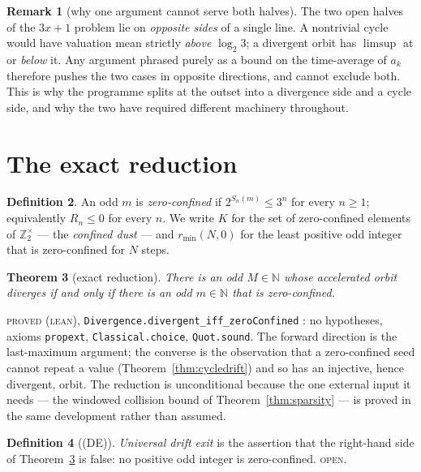 \documentclass[11pt,reqno]{amsart}
\theoremstyle{plain}
\newtheorem{theorem}{Theorem}[section]
\theoremstyle{definition}
\newtheorem{definition}[theorem]{Definition}
\newtheorem{remark}[theorem]{Remark}
\newcommand{\Zt}{\mathbb{Z}_2}
\newcommand{\N}{\mathbb{N}}
\newcommand{\lab}[1]{\textnormal{\textsc{\small #1}}}
\begin{document}
\begin{remark}[why one argument cannot serve both halves]\label{rem:twohalves}
The two open halves of the $3x+1$ problem lie on \emph{opposite sides} of a single
line. A nontrivial cycle would have valuation mean strictly \emph{above}
$\log_2 3$; a divergent orbit has $\limsup$ at or \emph{below} it. Any argument
phrased purely as a bound on the time-average of $a_k$ therefore pushes the two
cases in opposite directions, and cannot exclude both. This is why the programme
splits at the outset into a divergence side and a cycle side, and why the two have
required different machinery throughout.
\end{remark}

\section{The exact reduction}\label{sec:reduction}

\begin{definition}\label{def:confined}
An odd $m$ is \emph{zero-confined} if $2^{S_n(m)}\le 3^n$ for every $n\ge 1$;
equivalently $R_n\le 0$ for every $n$. We write $K$ for the set of zero-confined
elements of $\Zt^{\times}$ --- the \emph{confined dust} --- and $r_{\min}(N,0)$
for the least positive odd integer that is zero-confined for $N$ steps.
\end{definition}

\begin{theorem}[exact reduction]\label{thm:reduction}
There is an odd $M\in\N$ whose accelerated orbit diverges if and only if there is
an odd $m\in\N$ that is zero-confined.
\end{theorem}
\lab{proved (lean)}, \texttt{Divergence.divergent\_iff\_zeroConfined}
\cite{EOCDivergenceRepo}: no hypotheses, axioms \texttt{propext},
\texttt{Classical.choice}, \texttt{Quot.sound}. The forward direction is the
last-maximum argument; the converse is the observation that a zero-confined seed
cannot repeat a value (Theorem~\ref{thm:cycledrift}) and so has an injective,
hence divergent, orbit. The reduction is unconditional because the one external
input it needs --- the windowed collision bound of
Theorem~\ref{thm:sparsity} --- is proved in the same development rather than
assumed.

\begin{definition}[(DE)]\label{def:de}
\emph{Universal drift exit} is the assertion that the right-hand side of
Theorem~\ref{thm:reduction} is false: no positive odd integer is zero-confined.
\lab{open}.
\end{definition}
\end{document}
